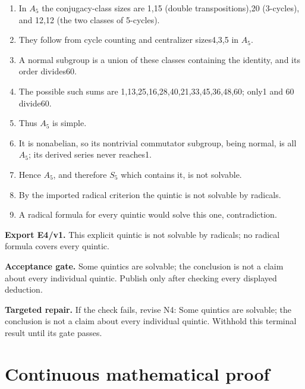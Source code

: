 \documentclass[preprint,12pt,aps,pra,showkeys,amsmath,amssymb,superscriptaddress,floatfix]{revtex4-2}
\theoremstyle{definition}
\theoremstyle{remark}
\newcommand{\field}[2]{\par\smallskip\noindent\textbf{#1.} #2\par}
\begin{document}
\begin{enumerate}[label=N4.\arabic*,leftmargin=3.4em]

\item In \(A_{5}\) the conjugacy-class sizes are 1,15 (double
transpositions),20 (3-cycles), and 12,12 (the two classes of 5-cycles).

\item They follow from cycle counting and centralizer sizes4,3,5 in \(A_{5}\).

\item A normal subgroup is a union of these classes containing the identity,
and its order divides60.

\item The possible such sums are 1,13,25,16,28,40,21,33,45,36,48,60; only1 and
60 divide60.

\item Thus \(A_{5}\) is simple.

\item It is nonabelian, so its nontrivial commutator subgroup, being normal,
is all \(A_{5}\); its derived series never reaches1.

\item Hence \(A_{5}\), and therefore \(S_{5}\) which contains it, is not
solvable.

\item By the imported radical criterion the quintic is not solvable by
radicals.

\item A radical formula for every quintic would solve this one, contradiction.

\end{enumerate}

\field{Export E4/v1}{This explicit quintic is not solvable by radicals; no radical formula
covers every quintic.}

\field{Acceptance gate}{Some quintics are solvable; the conclusion is not a claim about every
individual quintic. Publish only after checking every displayed
deduction.}

\field{Targeted repair}{If the check fails, revise N4: Some quintics are solvable; the
conclusion is not a claim about every individual quintic. Withhold this
terminal result until its gate passes.}

\endgroup\clearpage\section{Continuous mathematical proof}\label{sec:proof}
\end{document}
